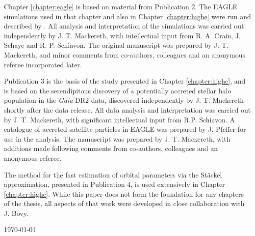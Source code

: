Chapter \ref{chapter:eagle} is based on material from Publication 2. The EAGLE simulations used in that chapter and also in Chapter \ref{chapter:highe} were run and described by \citet{2015MNRAS.446..521S,2015MNRAS.450.1937C}. All analysis and interpretation of the simulations was carried out independently by J. T. Mackereth, with intellectual input from R. A. Crain, J. Schaye and R. P. Schiavon. The original manuscript was prepared by J. T. Mackereth, and minor comments from co-authors, colleagues and an anonymous referee incorporated later.

Publication 3 is the basis of the study presented in Chapter \ref{chapter:highe}, and is based on the serendipitous discovery of a potentially accreted stellar halo population in the \emph{Gaia} DR2 data, discovered independently by J. T. Mackereth shortly after the data release. All data analysis and interpretation was carried out by J. T. Mackereth, with significant intellectual input from R.P. Schiavon. A catalogue of accreted satellite particles in EAGLE was prepared by J. Pfeffer for use in the analysis. The manuscript was prepared by J. T. Mackereth, with additions made following comments from co-authors, colleagues and an anonymous referee.

The method for the fast estimation of orbital parameters via the St\"ackel approximation, presented in Publication 4, is used extensively in Chapter \ref{chapter:highe}. While this paper does not form the foundation for any chapters of the thesis, all aspects of that work were developed in close collaboration with J. Bovy.



\vfill
{\sc \AuthorName \hfill\today}